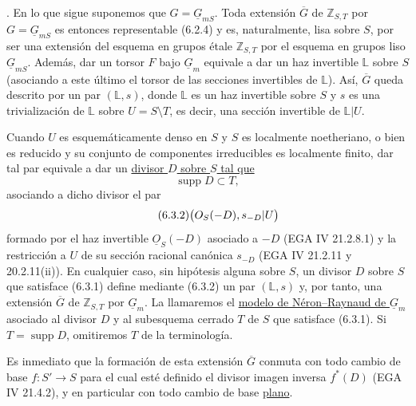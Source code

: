 
\medskip
{}. En lo que sigue suponemos que
$G=\underline G_{mS}$. Toda extensión $\overline G$ de
$\mathbb Z_{S,T}$ por $G=\underline G_{mS}$ es entonces representable
(6.2.4) y es, naturalmente, lisa sobre $S$, por ser una extensión del
esquema en grupos étale $\mathbb Z_{S,T}$ por el esquema en grupos liso
$\underline G_{mS}$. Además, dar un torsor $F$ bajo $\underline G_m$
equivale a dar un haz invertible $\mathbb L$ sobre $S$ (asociando a
este último el torsor de las secciones invertibles de $\mathbb L$).
Así, $\overline G$ queda descrito por un par $(\mathbb L,s)$, donde
$\mathbb L$ es un haz invertible sobre $S$ y $s$ es una trivialización
de $\mathbb L$ sobre $U=S\setminus T$, es decir, una sección invertible
de $\mathbb L|U$.

Cuando $U$ es esquemáticamente denso en $S$ y $S$ es localmente
noetheriano, o bien es reducido y su conjunto de componentes
irreducibles es localmente finito, dar tal par equivale a dar un
\underline{divisor $D$ sobre $S$ tal que}
\begin{equation}\tag{6.3.1}
 \operatorname{supp}D\subset T,
\end{equation}
asociando a dicho divisor el par
\begin{equation}\tag{6.3.2}
 \bigl(\underline O_S(-D),\sisi{s_D}{s_{-D}}|U\bigr)
\end{equation}
formado por el haz invertible $\underline O_S(-D)$ asociado a $-D$
(EGA IV 21.2.8.1) y la restricción a $U$ de su sección racional
canónica $s_{-D}$ (EGA IV 21.2.11 y 20.2.11(ii)). En cualquier caso,
sin hipótesis alguna sobre $S$, un divisor $D$ sobre $S$ que satisface
(6.3.1) define mediante (6.3.2) un par $(\mathbb L,s)$ y, por tanto,
una extensión $\overline G$ de $\mathbb Z_{S,T}$ por
$\underline G_m$. La llamaremos el \underline{modelo de
Néron--Raynaud de $\underline G_m$} asociado al divisor $D$ y al
subesquema cerrado $T$ de $S$ que satisface (6.3.1). Si
$T=\operatorname{supp}D$, omitiremos $T$ de la terminología.


Es inmediato que la formación de esta extensión $\overline G$ conmuta
con todo cambio de base $f:S'\to S$ para el cual esté definido el
divisor imagen inversa $f^*(D)$ (EGA IV 21.4.2), y en particular con
todo cambio de base \underline{plano}.

